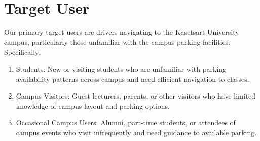 \section{Target User}
\label{section:target-user}





Our primary target users are drivers navigating to the Kasetsart University campus, particularly those unfamiliar with the campus parking facilities. Specifically:
\begin{enumerate}[leftmargin=80pt]
\item Students: New or visiting students who are unfamiliar with parking availability patterns across campus and need efficient navigation to classes.
\item Campus Visitors: Guest lecturers, parents, or other visitors who have limited knowledge of campus layout and parking options.
\item Occasional Campus Users: Alumni, part-time students, or attendees of campus events who visit infrequently and need guidance to available parking.
\end{enumerate}
